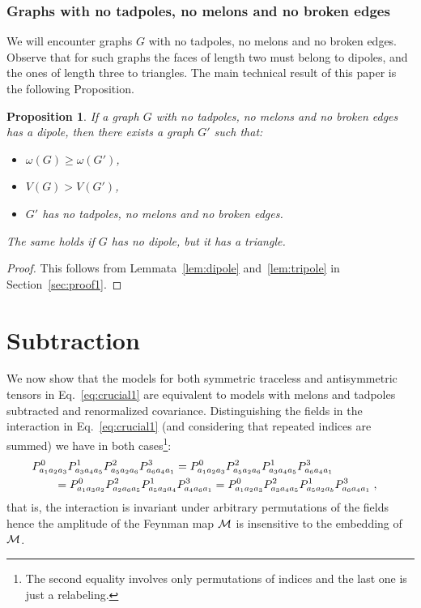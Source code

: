 \documentclass[10pt]{article}
\theoremstyle{plain}
\newtheorem{proposition}{Proposition}
\theoremstyle{definition}
\newcommand{\cM}{{\cal M}}
\begin{document}
\subsubsection{Graphs with no tadpoles, no melons and no broken edges} 
 
We will encounter graphs $G$ with no tadpoles, no melons and no broken edges. 
Observe that for such graphs the faces of length two must belong to dipoles, and the ones of length three to triangles. 
 The main technical result of this paper is the following Proposition.
 
\begin{proposition}\label{prop:moves}
 If a graph $G$ with no tadpoles, no melons and no broken edges has a dipole, then there exists a graph $G'$ such that:
     \begin{itemize}
         \item $\omega(G) \ge \omega(G')$,
         \item $V(G)> V(G')$,
         \item $G'$ has no tadpoles, no melons and no broken edges.
\end{itemize}
The same holds if $G$ has no dipole, but it has a triangle.
\end{proposition}
\begin{proof}
This follows from Lemmata~\ref{lem:dipole} and~\ref{lem:tripole} in Section~\ref{sec:proof1}.

\end{proof}

  
 \newpage
 
 
\section{Subtraction}
\label{sec:subtr}

We now show that the models for both symmetric traceless and antisymmetric tensors in Eq.~\eqref{eq:crucial1} are equivalent 
to models with melons and tadpoles subtracted and renormalized covariance.
Distinguishing the fields in the interaction in Eq.~\ref{eq:crucial1} (and considering that repeated indices are summed) we have in 
both cases\footnote{The second equality involves only permutations of indices and the last one is just a relabeling.}: 
\begin{align*}
 & P^0_{a_1a_2a_3}   P^1_{a_3a_4a_5}    P^2_{a_5 a_2 a_6}  P^3_{a_6a_4 a_1}  = 
 P^0_{a_1a_2a_3}  P^2_{a_5 a_2 a_6}   P^1_{a_3a_4a_5}  P^3_{a_6a_4 a_1}  \crcr 
 & \qquad  =P^0_{a_1a_3a_2}  P^2_{a_2 a_6 a_5}        P^1_{a_5a_3a_4}  P^3_{a_4a_6 a_1} = 
   P^0_{a_1a_2a_3}  P^2_{a_3 a_4 a_5}   P^1_{a_5a_2a_b}  P^3_{a_6a_4 a_1} \;,  
\end{align*}
that is, the interaction is invariant under arbitrary permutations of the fields hence the amplitude of the Feynman map $\cM$ is insensitive to the embedding of $\cM$. 
\end{document}
